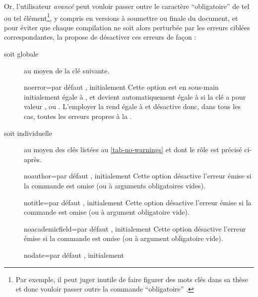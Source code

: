 Or, l'utilisateur \emph{avancé} peut vouloir passer outre le caractère
\enquote{obligatoire} de tel ou tel élément\footnote{Par exemple, il peut juger
  inutile de faire figurer des mots clés dans sa thèse et donc vouloir passer
  outre la commande \enquote{obligatoire} \protect{}.},
y compris en versions à soumettre ou finale du document, et pour éviter que
chaque compilation ne soit alors perturbée par les erreurs ciblées
correspondantes, la \yatCl{} propose de désactiver ces erreurs de façon :
\begin{description}
\item[soit globale] au moyen de la clé  suivante.
  \begin{docKey}{noerror}{=\textbar{}}{par défaut
      , initialement }
    Cette option est en sous-main initialement égale à , et
    devient automatiquement égale à  si la clé 
    a pour valeur ,  ou
    . L'employer la rend égale à  et désactive
    donc, dans tous les cas, toutes les erreurs propres à la \yatCl{}.
  \end{docKey}
\item[soit individuelle] au moyen des clés listées au \vref{tab-no-warnings} et
  dont le rôle est précisé ci-après.
  \begin{docKey}{noauthor}{=\textbar{}}{par défaut
      , initialement }
    Cette option désactive l'erreur émise si la commande  est
    omise (ou à arguments obligatoires vides).
  \end{docKey}
  \begin{docKey}{notitle}{=\textbar{}}{par défaut
      , initialement }
    Cette option désactive l'erreur émise si la commande  est
    omise (ou à argument obligatoire vide).
  \end{docKey}
  \begin{docKey}{noacademicfield}{=\textbar{}}{par
      défaut , initialement }
    Cette option désactive l'erreur émise si la commande 
    est omise (ou à argument obligatoire vide).
  \end{docKey}
  \begin{docKey}{nodate}{=\textbar{}}{par défaut
      , initialement }

\end{docKey}
\end{description}
